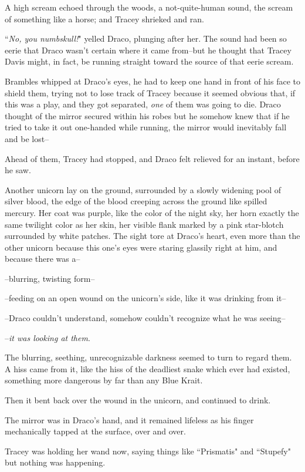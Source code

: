 A high scream echoed through the woods, a not-quite-human sound, the scream of something like a horse; and Tracey shrieked and ran.

``\emph{No, you numbskull!}" yelled Draco, plunging after her. The sound had been so eerie that Draco wasn't certain where it came from\---but he thought that Tracey Davis might, in fact, be running straight toward the source of that eerie scream.

Brambles whipped at Draco's eyes, he had to keep one hand in front of his face to shield them, trying not to lose track of Tracey because it seemed obvious that, if this was a play, and they got separated, \emph{one} of them was going to die. Draco thought of the mirror secured within his robes but he somehow knew that if he tried to take it out one-handed while running, the mirror would inevitably fall and be lost\---

Ahead of them, Tracey had stopped, and Draco felt relieved for an instant, before he saw.

Another unicorn lay on the ground, surrounded by a slowly widening pool of silver blood, the edge of the blood creeping across the ground like spilled mercury. Her coat was purple, like the color of the night sky, her horn exactly the same twilight color as her skin, her visible flank marked by a pink star-blotch surrounded by white patches. The sight tore at Draco's heart, even more than the other unicorn because this one's eyes were staring glassily right at him, and because there was a\---

\---blurring, twisting form\---

\---feeding on an open wound on the unicorn's side, like it was drinking from it\---

\---Draco couldn't understand, somehow couldn't recognize what he was seeing\---

\---\emph{it was looking at them}.

The blurring, seething, unrecognizable darkness seemed to turn to regard them. A hiss came from it, like the hiss of the deadliest snake which ever had existed, something more dangerous by far than any Blue Krait.

Then it bent back over the wound in the unicorn, and continued to drink.

The mirror was in Draco's hand, and it remained lifeless as his finger mechanically tapped at the surface, over and over.

Tracey was holding her wand now, saying things like ``Prismatis" and ``Stupefy" but nothing was happening.

